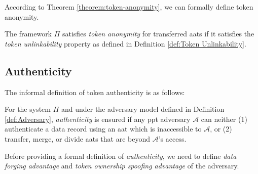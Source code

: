 According to Theorem \ref{theorem:token-anonymity}, we can formally define token anonymity.

\begin{definition}
    \label{def:Token anonymity}
    The framework \( \Pi \) satisfies \textit{token anonymity} for transferred \gls{aat}s if it satisfies the \textit{token unlinkability} property as defined in Definition \ref{def:Token Unlinkability}.
\end{definition}


\subsection{Authenticity}
\label{app-sec:Authenticity}

The informal definition of token authenticity is as follows:

\begin{definition}
    \label{def:informal-Authenticity}
    For the system  \( \Pi \) and under the adversary model defined in Definition \ref{def:Adversary}, \textit{authenticity} is ensured if any \gls{ppt} adversary \( \mathcal{A} \) can neither (1) authenticate a data record using an \gls{aat} which is inaccessible to \( \mathcal{A} \), or (2) transfer, merge, or divide \gls{aat}s that are beyond \( \mathcal{A} \)'s access. 
\end{definition}

Before providing a formal definition of \textit{authenticity}, we need to define \textit{data forging advantage} and \textit{token ownership spoofing advantage} of the adversary.

